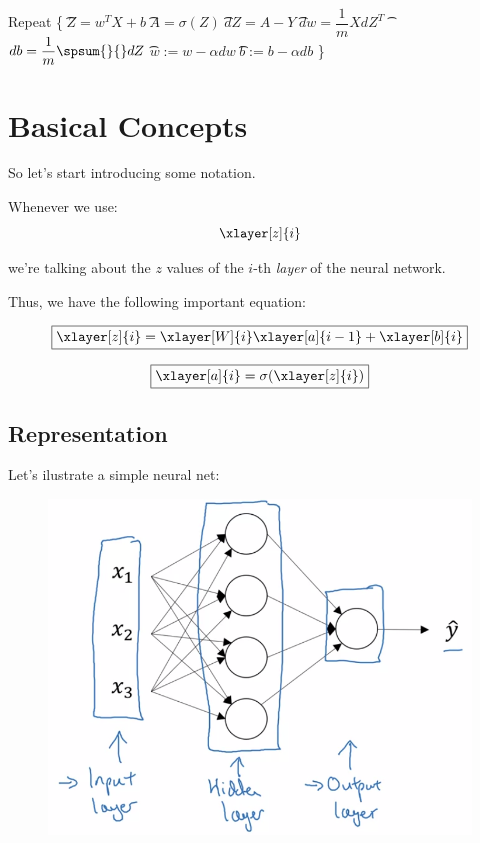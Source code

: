 \documentclass[12pt, a4paper, oneside]{book}
\begin{document}
\begin{algorithm}
Repeat \{ \nl
\t $Z=w^{T}X+b$ \nl
\t $A=\sigma(Z)$ \nl
\t $dZ = A - Y$ \nl
\t $dw = \dfrac{1}{m}XdZ^{T}$ \nl
\t $db = \dfrac{1}{m}\spsum{}{}dZ$ \nl
\t $w:=w-\alpha dw$ \nl
\t $b:=b-\alpha db$ \nl
\}
\end{algorithm}


\chapter{Basical Concepts}%
\label{cha:basical_concepts}

So let's start introducing some notation.

Whenever we use:
\[
    \xlayer[z]{i}
\]

we're talking about the $z$ values of the $i$-th \textit{layer} of the neural
network.

Thus, we have the following important equation:


\begin{equation}
\boxed{
    \xlayer[z]{i} = \xlayer[W]{i}\xlayer[a]{i-1} + \xlayer[b]{i}}
\label{forward-z}
\end{equation}

\begin{equation}
\boxed{
    \xlayer[a]{i} = \sigma(\xlayer[z]{i})}
\label{foward-activation}
\end{equation}

\section{Representation}%
\label{sec:representation}

Let's ilustrate a simple neural net:

\begin{figure}[h]
\centering
\includegraphics[scale=0.5]{Res/nn_representation.png}
\label{nn_representation.png}
\end{figure}
\end{document}
